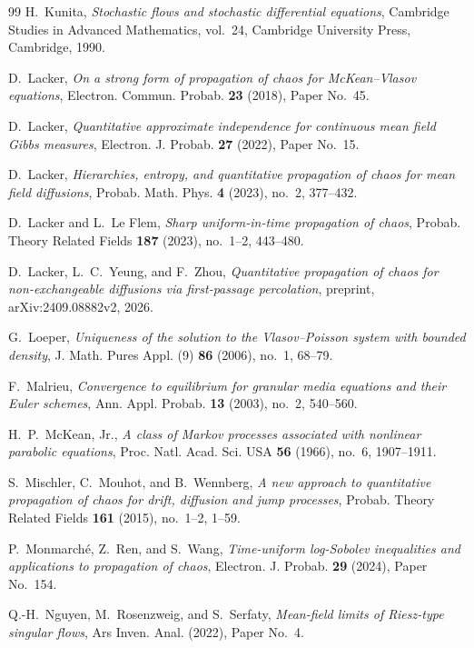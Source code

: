\documentclass[11pt]{amsart}
\numberwithin{equation}{section}
\theoremstyle{plain}
\theoremstyle{remark}
\begin{document}
\begin{thebibliography}{99}
H.~Kunita, \emph{Stochastic flows and stochastic differential equations}, Cambridge Studies in Advanced Mathematics, vol.~24, Cambridge University Press, Cambridge, 1990.

D.~Lacker, \emph{On a strong form of propagation of chaos for McKean--Vlasov equations}, Electron. Commun. Probab. \textbf{23} (2018), Paper No.~45.

D.~Lacker, \emph{Quantitative approximate independence for continuous mean field Gibbs measures}, Electron. J. Probab. \textbf{27} (2022), Paper No.~15.

D.~Lacker, \emph{Hierarchies, entropy, and quantitative propagation of chaos for mean field diffusions}, Probab. Math. Phys. \textbf{4} (2023), no.~2, 377--432.

D.~Lacker and L.~Le Flem, \emph{Sharp uniform-in-time propagation of chaos}, Probab. Theory Related Fields \textbf{187} (2023), no.~1--2, 443--480.

D.~Lacker, L.~C.~Yeung, and F.~Zhou, \emph{Quantitative propagation of chaos for non-exchangeable diffusions via first-passage percolation}, preprint, arXiv:2409.08882v2, 2026.

G.~Loeper, \emph{Uniqueness of the solution to the Vlasov--Poisson system with bounded density}, J. Math. Pures Appl. (9) \textbf{86} (2006), no.~1, 68--79.

F.~Malrieu, \emph{Convergence to equilibrium for granular media equations and their Euler schemes}, Ann. Appl. Probab. \textbf{13} (2003), no.~2, 540--560.

H.~P.~McKean, Jr., \emph{A class of Markov processes associated with nonlinear parabolic equations}, Proc. Natl. Acad. Sci. USA \textbf{56} (1966), no.~6, 1907--1911.

S.~Mischler, C.~Mouhot, and B.~Wennberg, \emph{A new approach to quantitative propagation of chaos for drift, diffusion and jump processes}, Probab. Theory Related Fields \textbf{161} (2015), no.~1--2, 1--59.

P.~Monmarch\'e, Z.~Ren, and S.~Wang, \emph{Time-uniform log-Sobolev inequalities and applications to propagation of chaos}, Electron. J. Probab. \textbf{29} (2024), Paper No.~154.

Q.-H.~Nguyen, M.~Rosenzweig, and S.~Serfaty, \emph{Mean-field limits of Riesz-type singular flows}, Ars Inven. Anal. (2022), Paper No.~4.


\end{thebibliography}
\end{document}
